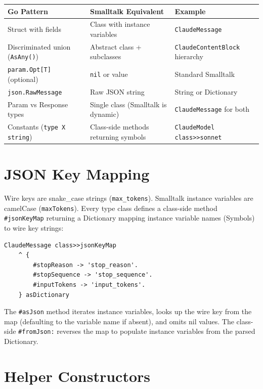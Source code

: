 \documentclass[a4paper,10pt,fleqn]{article}
\newcommand{\cls}[1]{\texttt{#1}}
\newcommand{\sel}[1]{\texttt{\##1}}
\begin{document}
\begin{center}
\begin{tabularx}{\linewidth}{@{}lYY@{}}
\toprule
\textbf{Go Pattern} & \textbf{Smalltalk Equivalent} & \textbf{Example} \\
\midrule
Struct with fields  & Class with instance variables    &
  \cls{ClaudeMessage} \\
Discriminated union (\texttt{AsAny()}) & Abstract class + subclasses &
  \cls{ClaudeContentBlock} hierarchy \\
\texttt{param.Opt[T]} (optional) & \texttt{nil} or value &
  Standard Smalltalk \\
\texttt{json.RawMessage} & Raw JSON string &
  String or Dictionary \\
Param vs Response types & Single class (Smalltalk is dynamic) &
  \cls{ClaudeMessage} for both \\
Constants (\texttt{type X string}) & Class-side methods returning symbols &
  \cls{ClaudeModel class>>sonnet} \\
\bottomrule
\end{tabularx}
\end{center}

\section{JSON Key Mapping}

Wire keys are snake\_case strings (\texttt{max\_tokens}).  Smalltalk instance
variables are camelCase (\texttt{maxTokens}).  Every type class defines a
class-side method \sel{jsonKeyMap} returning a Dictionary mapping instance
variable names (Symbols) to wire key strings:

\begin{lstlisting}[language={},title={JSON key mapping}]
ClaudeMessage class>>jsonKeyMap
    ^ {
        #stopReason -> 'stop_reason'.
        #stopSequence -> 'stop_sequence'.
        #inputTokens -> 'input_tokens'.
    } asDictionary
\end{lstlisting}

The \sel{asJson} method iterates instance variables, looks up the wire key
from the map (defaulting to the variable name if absent), and omits nil
values.  The class-side \sel{fromJson:} reverses the map to populate
instance variables from the parsed Dictionary.

\section{Helper Constructors}
\end{document}
